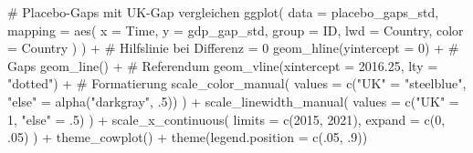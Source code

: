 \documentclass[
  a4paper,
  DIV=11,
  oneside]{scrreprt}
\newenvironment{Shaded}{\begin{snugshade}}{\end{snugshade}}
\newcommand{\AttributeTok}[1]{\textcolor[rgb]{0.40,0.45,0.13}{#1}}
\newcommand{\CommentTok}[1]{\textcolor[rgb]{0.37,0.37,0.37}{#1}}
\newcommand{\DecValTok}[1]{\textcolor[rgb]{0.68,0.00,0.00}{#1}}
\newcommand{\FloatTok}[1]{\textcolor[rgb]{0.68,0.00,0.00}{#1}}
\newcommand{\FunctionTok}[1]{\textcolor[rgb]{0.28,0.35,0.67}{#1}}
\newcommand{\NormalTok}[1]{\textcolor[rgb]{0.00,0.23,0.31}{#1}}
\newcommand{\OtherTok}[1]{\textcolor[rgb]{0.00,0.23,0.31}{#1}}
\newcommand{\SpecialCharTok}[1]{\textcolor[rgb]{0.37,0.37,0.37}{#1}}
\newcommand{\StringTok}[1]{\textcolor[rgb]{0.13,0.47,0.30}{#1}}
\begin{document}
\begin{Shaded}
\begin{Highlighting}[]
\CommentTok{\# Placebo{-}Gaps mit UK{-}Gap vergleichen}
\FunctionTok{ggplot}\NormalTok{(}
  \AttributeTok{data =}\NormalTok{ placebo\_gaps\_std,}
  \AttributeTok{mapping =} \FunctionTok{aes}\NormalTok{(}
    \AttributeTok{x =}\NormalTok{ Time, }
    \AttributeTok{y =}\NormalTok{ gdp\_gap\_std,}
    \AttributeTok{group =}\NormalTok{ ID,}
    \AttributeTok{lwd =}\NormalTok{ Country,}
    \AttributeTok{color =}\NormalTok{ Country}
\NormalTok{  )}
\NormalTok{) }\SpecialCharTok{+}
  \CommentTok{\# Hilfslinie bei Differenz = 0}
  \FunctionTok{geom\_hline}\NormalTok{(}\AttributeTok{yintercept =} \DecValTok{0}\NormalTok{) }\SpecialCharTok{+}
  \CommentTok{\# Gaps}
  \FunctionTok{geom\_line}\NormalTok{() }\SpecialCharTok{+}
  \CommentTok{\# Referendum}
  \FunctionTok{geom\_vline}\NormalTok{(}\AttributeTok{xintercept =} \FloatTok{2016.25}\NormalTok{, }\AttributeTok{lty =} \StringTok{"dotted"}\NormalTok{) }\SpecialCharTok{+}
  \CommentTok{\# Formatierung}
  \FunctionTok{scale\_color\_manual}\NormalTok{(}
    \AttributeTok{values =} \FunctionTok{c}\NormalTok{(}\StringTok{"UK"} \OtherTok{=} \StringTok{"steelblue"}\NormalTok{, }\StringTok{"else"} \OtherTok{=} \FunctionTok{alpha}\NormalTok{(}\StringTok{"darkgray"}\NormalTok{, .}\DecValTok{5}\NormalTok{))}
\NormalTok{  ) }\SpecialCharTok{+}
  \FunctionTok{scale\_linewidth\_manual}\NormalTok{(}
    \AttributeTok{values =} \FunctionTok{c}\NormalTok{(}\StringTok{"UK"} \OtherTok{=} \DecValTok{1}\NormalTok{, }\StringTok{"else"} \OtherTok{=}\NormalTok{ .}\DecValTok{5}\NormalTok{)}
\NormalTok{  ) }\SpecialCharTok{+}
  \FunctionTok{scale\_x\_continuous}\NormalTok{(}
    \AttributeTok{limits =} \FunctionTok{c}\NormalTok{(}\DecValTok{2015}\NormalTok{, }\DecValTok{2021}\NormalTok{), }\AttributeTok{expand =} \FunctionTok{c}\NormalTok{(}\DecValTok{0}\NormalTok{, .}\DecValTok{05}\NormalTok{)}
\NormalTok{  ) }\SpecialCharTok{+}
  \FunctionTok{theme\_cowplot}\NormalTok{() }\SpecialCharTok{+}
  \FunctionTok{theme}\NormalTok{(}\AttributeTok{legend.position =} \FunctionTok{c}\NormalTok{(.}\DecValTok{05}\NormalTok{, .}\DecValTok{9}\NormalTok{))}
\end{Highlighting}
\end{Shaded}
\end{document}
